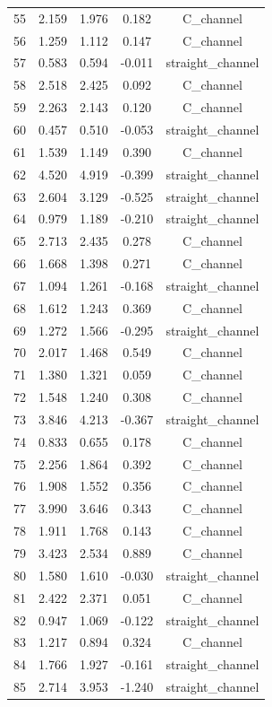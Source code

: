 \begin{longtable}{ccccc}
55 & 2.159 & 1.976 & 0.182 & C_channel \\
56 & 1.259 & 1.112 & 0.147 & C_channel \\
57 & 0.583 & 0.594 & -0.011 & straight_channel \\
58 & 2.518 & 2.425 & 0.092 & C_channel \\
59 & 2.263 & 2.143 & 0.120 & C_channel \\
60 & 0.457 & 0.510 & -0.053 & straight_channel \\
61 & 1.539 & 1.149 & 0.390 & C_channel \\
62 & 4.520 & 4.919 & -0.399 & straight_channel \\
63 & 2.604 & 3.129 & -0.525 & straight_channel \\
64 & 0.979 & 1.189 & -0.210 & straight_channel \\
65 & 2.713 & 2.435 & 0.278 & C_channel \\
66 & 1.668 & 1.398 & 0.271 & C_channel \\
67 & 1.094 & 1.261 & -0.168 & straight_channel \\
68 & 1.612 & 1.243 & 0.369 & C_channel \\
69 & 1.272 & 1.566 & -0.295 & straight_channel \\
70 & 2.017 & 1.468 & 0.549 & C_channel \\
71 & 1.380 & 1.321 & 0.059 & C_channel \\
72 & 1.548 & 1.240 & 0.308 & C_channel \\
73 & 3.846 & 4.213 & -0.367 & straight_channel \\
74 & 0.833 & 0.655 & 0.178 & C_channel \\
75 & 2.256 & 1.864 & 0.392 & C_channel \\
76 & 1.908 & 1.552 & 0.356 & C_channel \\
77 & 3.990 & 3.646 & 0.343 & C_channel \\
78 & 1.911 & 1.768 & 0.143 & C_channel \\
79 & 3.423 & 2.534 & 0.889 & C_channel \\
80 & 1.580 & 1.610 & -0.030 & straight_channel \\
81 & 2.422 & 2.371 & 0.051 & C_channel \\
82 & 0.947 & 1.069 & -0.122 & straight_channel \\
83 & 1.217 & 0.894 & 0.324 & C_channel \\
84 & 1.766 & 1.927 & -0.161 & straight_channel \\
85 & 2.714 & 3.953 & -1.240 & straight_channel \\

\end{longtable}
